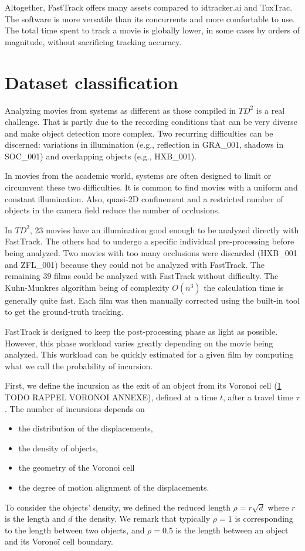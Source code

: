     Altogether, FastTrack offers many assets compared to idtracker.ai and ToxTrac. The software is more versatile than its concurrents and more comfortable to use. The total time spent to track a movie is globally lower, in some cases by orders of magnitude, without sacrificing tracking accuracy.

	\section{Dataset classification}
    Analyzing movies from systems as different as those compiled in $TD^2$ is a real challenge. That is partly due to the recording conditions that can be very diverse and make object detection more complex. Two recurring difficulties can be discerned: variations in illumination (e.g., reflection in GRA\_001, shadows in SOC\_001) and overlapping objects (e.g., HXB\_001).

    In movies from the academic world, systems are often designed to limit or circumvent these two difficulties. It is common to find movies with a uniform and constant illumination. Also, quasi-2D confinement and a restricted number of objects in the camera field reduce the number of occlusions.

    In $TD^2$, 23 movies have an illumination good enough to be analyzed directly with FastTrack. The others had to undergo a specific individual pre-processing before being analyzed. Two movies with too many occlusions were discarded (HXB\_001 and ZFL\_001) because they could not be analyzed with FastTrack.
    The remaining 39 films could be analyzed with FastTrack without difficulty. The Kuhn-Munkres algorithm being of complexity $O(n^3)$ the calculation time is generally quite fast. Each film was then manually corrected using the built-in tool to get the ground-truth tracking.

    FastTrack is designed to keep the post-processing phase as light as possible. However, this phase workload varies greatly depending on the movie being analyzed. This workload can be quickly estimated for a given film by computing what we call the probability of incursion.

    First, we define the incursion as the exit of an object from its Voronoi cell (\ref{} TODO RAPPEL VORONOI ANNEXE), defined at a time $t$, after a travel time $\tau$. The number of incursions depends on
    \begin{itemize}
    \item the distribution of the displacements,
    \item the density of objects,
    \item the geometry of the Voronoi cell
    \item the degree of motion alignment of the displacements.
    \end{itemize}
    To consider the objects' density, we defined the reduced length $\rho=r\sqrt{d}$ where $r$ is the length and $d$ the density. We remark that typically $\rho=1$ is corresponding to the length between two objects, and $\rho=0.5$ is the length between an object and its Voronoï cell boundary.

